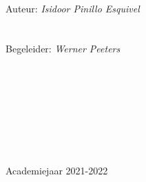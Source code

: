 \begin{titlepage}
\begin{center}
        \ \\
        \normalsize
        Auteur: {\em Isidoor Pinillo Esquivel}\\
        \ \\
        \ \\
        Begeleider: {\em Werner Peeters}\\
        \ \\
        \ \\
        \ \\
        \ \\
        \ \\
        \ \\
        \ \\
        \ \\

        A{\sc cademiejaar 2021-2022}

    \end{center}
\end{titlepage}